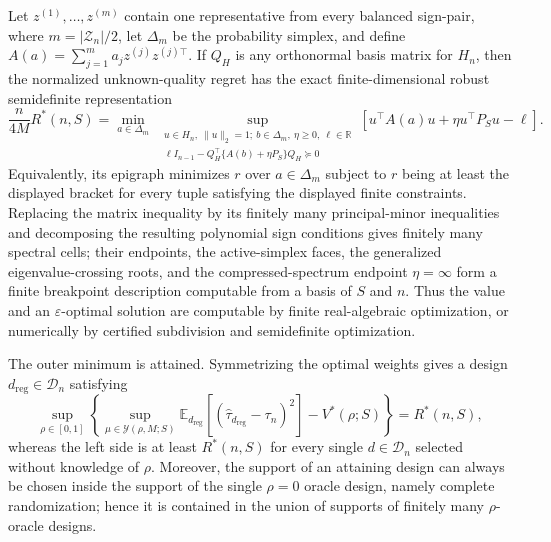 Let \(z^{(1)},\ldots,z^{(m)}\) contain one representative from every balanced sign-pair, where \(m=|\mathcal Z_n|/2\), let \(\Delta_m\) be the probability simplex, and define \(A(a)=\sum_{j=1}^m a_jz^{(j)}z^{(j)\top}\).  If \(Q_H\) is any orthonormal basis matrix for \(H_n\), then the normalized unknown-quality regret has the exact finite-dimensional robust semidefinite representation
\[
\frac{n}{4M}R^*(n,S)
=\min_{a\in\Delta_m}\ \sup_{\substack{u\in H_n,\ \|u\|_2=1;\ b\in\Delta_m,\ \eta\geq0,\ \ell\in\mathbb R\\
\ell I_{n-1}-Q_H^\top\{A(b)+\eta P_S\}Q_H\succeq0}}
\left[u^\top A(a)u+\eta u^\top P_Su-\ell\right].
\]
Equivalently, its epigraph minimizes \(r\) over \(a\in\Delta_m\) subject to \(r\) being at least the displayed bracket for every tuple satisfying the displayed finite constraints.  Replacing the matrix inequality by its finitely many principal-minor inequalities and decomposing the resulting polynomial sign conditions gives finitely many spectral cells; their endpoints, the active-simplex faces, the generalized eigenvalue-crossing roots, and the compressed-spectrum endpoint \(\eta=\infty\) form a finite breakpoint description computable from a basis of \(S\) and \(n\).  Thus the value and an \(\varepsilon\)-optimal solution are computable by finite real-algebraic optimization, or numerically by certified subdivision and semidefinite optimization.

The outer minimum is attained.  Symmetrizing the optimal weights gives a design \(d_{\mathrm{reg}}\in\mathcal D_n\) satisfying
\[
\sup_{\rho\in[0,1]}
\left\{
\sup_{\mu\in\mathcal Y(\rho,M;S)}
\mathbb E_{d_{\mathrm{reg}}}[(\widehat\tau_{d_{\mathrm{reg}}}-\tau_n)^2]
-V^*(\rho;S)
\right\}=R^*(n,S),
\]
whereas the left side is at least \(R^*(n,S)\) for every single \(d\in\mathcal D_n\) selected without knowledge of \(\rho\).  Moreover, the support of an attaining design can always be chosen inside the support of the single \(\rho=0\) oracle design, namely complete randomization; hence it is contained in the union of supports of finitely many \(\rho\)-oracle designs.